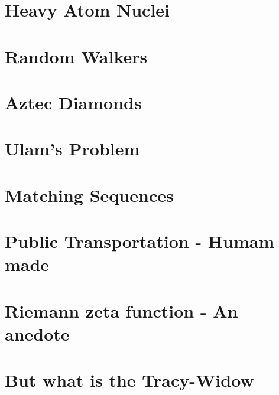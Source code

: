\section{Heavy Atom Nuclei}



\section{Random Walkers}



\section{Aztec Diamonds}



\section{Ulam's Problem}



\section{Matching Sequences}



\section{Public Transportation - Humam made}



\section{Riemann zeta function - An anedote}



\section{But what is the Tracy-Widow}

